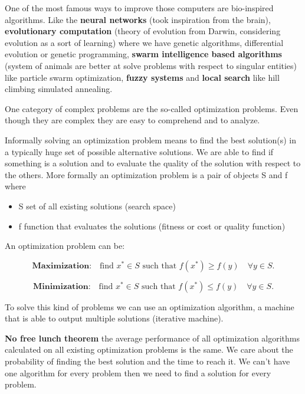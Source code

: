 \vspace{10pt}

One of the most famous ways to improve those computers are bio-inspired algorithms. Like the \textbf{neural networks} (took inspiration from the brain), \textbf{evolutionary computation} (theory of evolution from Darwin, considering evolution as a sort of learning) where we have genetic algorithms, differential evolution or genetic programming, \textbf{swarm intelligence based algorithms} (system of animals are better at solve problems with respect to singular entities) like particle swarm optimization, \textbf{fuzzy systems} and \textbf{local search} like hill climbing simulated annealing.  

\vspace{10pt}

One category of complex problems are the so-called optimization problems. Even though they are complex they are easy to comprehend and to analyze.

Informally solving an optimization problem means to find the best solution(s) in a typically huge set of possible alternative solutions. We are able to find if something is a solution and to evaluate the quality of the solution with respect to the others. More formally an optimization problem is a pair of objects S and f where
\begin{itemize}
    \item S \ra set of all existing solutions (search space)
    \item f \ra function that evaluates the solutions (fitness or cost or quality function)
\end{itemize}

An optimization problem can be:

\[
\textbf{Maximization:} \quad \text{find } x^\ast \in S \text{ such that } 
f(x^\ast) \geq f(y) \quad \forall y \in S.
\]

\[
\textbf{Minimization:} \quad \text{find } x^\ast \in S \text{ such that } 
f(x^\ast) \leq f(y) \quad \forall y \in S.
\]

To solve this kind of problems we can use an optimization algorithm, a machine that is able to output multiple solutions (iterative machine). 

\vspace{10pt}

\textbf{No free lunch theorem} \ra the average performance of all optimization algorithms calculated on all existing optimization problems is the same. We care about the probability of finding the best solution and the time to reach it. We can't have one algorithm for every problem then we need to find a solution for every problem.


